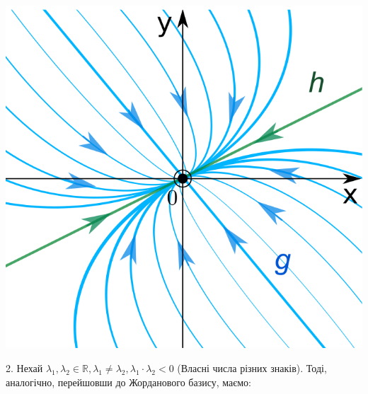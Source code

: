 \begin{example}
    \begin{center} \includegraphics[scale=0.4]{assets/lectures_recent-06adae22.png} \end{center}
\end{example}

2. Нехай $ \lambda_1 , \lambda_2 \in \mathbb{R}, \lambda_1 \neq \lambda_2, \lambda_1 \cdot \lambda_2 < 0$ (Власні числа різних знаків).
Тоді, аналогічно, перейшовши до Жорданового базису, маємо:

